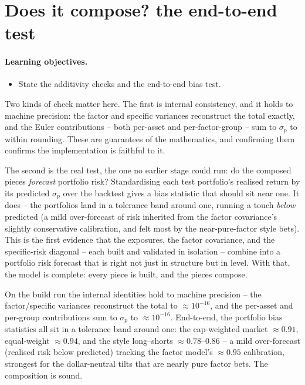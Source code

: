 \documentclass[11pt]{article}
\theoremstyle{definition}
\theoremstyle{plain}
\theoremstyle{remark}
\begin{document}
\section{Does it compose? the end-to-end test}\label{sec:valid}

\paragraph{Learning objectives.}
\begin{itemize}[leftmargin=1.4em,topsep=2pt]
  \item State the additivity checks and the end-to-end bias test.
\end{itemize}

Two kinds of check matter here. The first is internal consistency, and it holds to machine precision: the factor and specific variances reconstruct the total exactly, and the Euler contributions -- both per-asset and per-factor-group -- sum to $\sigma_p$ to within rounding. These are guarantees of the mathematics, and confirming them confirms the implementation is faithful to it.

The second is the real test, the one no earlier stage could run: do the composed pieces \emph{forecast} portfolio risk? Standardising each test portfolio's realised return by its predicted $\sigma_p$ over the backtest gives a bias statistic that should sit near one. It does -- the portfolios land in a tolerance band around one, running a touch \emph{below} predicted (a mild over-forecast of risk inherited from the factor covariance's slightly conservative calibration, and felt most by the near-pure-factor style bets). This is the first evidence that the exposures, the factor covariance, and the specific-risk diagonal -- each built and validated in isolation -- combine into a portfolio risk forecast that is right not just in structure but in level. With that, the model is complete: every piece is built, and the pieces compose.

\begin{observed}
On the build run the internal identities hold to machine precision -- the factor/specific variances reconstruct the total to $\approx 10^{-16}$, and the per-asset and per-group contributions sum to $\sigma_p$ to $\approx 10^{-16}$. End-to-end, the portfolio bias statistics all sit in a tolerance band around one: the cap-weighted market $\approx 0.91$, equal-weight $\approx 0.94$, and the style long--shorts $\approx 0.78$--$0.86$ -- a mild over-forecast (realised risk below predicted) tracking the factor model's $\approx 0.95$ calibration, strongest for the dollar-neutral tilts that are nearly pure factor bets. The composition is sound.
\end{observed}
\end{document}

